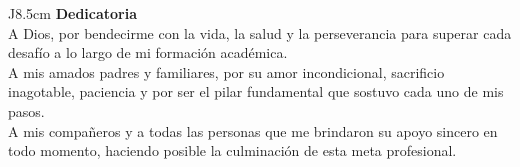 
\newpage

%
%

\begin{flushright}
    \begin{itshape}
        \vspace*{\fill}
        
        \begin{tabular}{J{8.5cm}}
            \hspace{\fill} \textbf{\Large Dedicatoria}\\
            \newline
            A Dios, por bendecirme con la vida, la salud y la perseverancia para superar cada desafío a lo largo de mi formación académica.\\
            \newline
            A mis amados padres y familiares, por su amor incondicional, sacrificio inagotable, paciencia y por ser el pilar fundamental que sostuvo cada uno de mis pasos.\\
            \newline
            A mis compañeros y a todas las personas que me brindaron su apoyo sincero en todo momento, haciendo posible la culminación de esta meta profesional.
        \end{tabular}
        
        \vspace{\fill}
    \end{itshape}
\end{flushright}